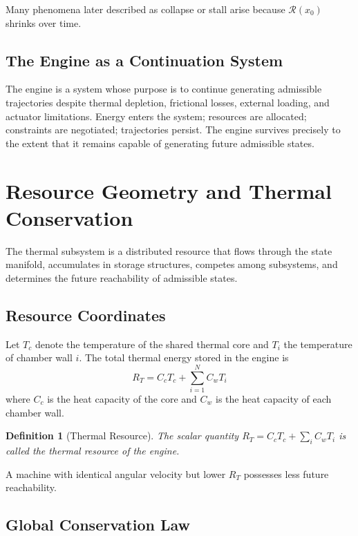 \documentclass[12pt,a4paper]{article}
\newtheorem{definition}[theorem]{Definition}
\begin{document}
Many phenomena later described as collapse or stall arise because $\mathcal{R}(x_0)$ shrinks over time.

\subsection{The Engine as a Continuation System}

The engine is a system whose purpose is to continue generating admissible trajectories despite thermal depletion, frictional losses, external loading, and actuator limitations. Energy enters the system; resources are allocated; constraints are negotiated; trajectories persist. The engine survives precisely to the extent that it remains capable of generating future admissible states.

\section{Resource Geometry and Thermal Conservation}

The thermal subsystem is a distributed resource that flows through the state manifold, accumulates in storage structures, competes among subsystems, and determines the future reachability of admissible states.

\subsection{Resource Coordinates}

Let $T_c$ denote the temperature of the shared thermal core and $T_i$ the temperature of chamber wall $i$. The total thermal energy stored in the engine is
\[
R_T = C_c T_c + \sum_{i=1}^{N} C_w T_i
\]
where $C_c$ is the heat capacity of the core and $C_w$ is the heat capacity of each chamber wall.

\begin{definition}[Thermal Resource]
The scalar quantity $R_T = C_c T_c + \sum_i C_w T_i$ is called the \emph{thermal resource} of the engine.
\end{definition}

A machine with identical angular velocity but lower $R_T$ possesses less future reachability.

\subsection{Global Conservation Law}
\end{document}
